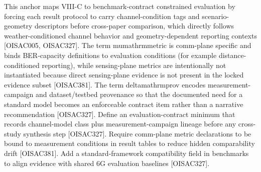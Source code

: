{}\markdownRendererDollarSign{}\markdownRendererDollarSign{}\markdownRendererParagraphSeparator
{}This anchor maps VIII-C to benchmark-contract constrained evaluation by forcing each result protocol to carry channel-condition tags and scenario-geometry descriptors before cross-paper comparison, which directly follows weather-conditioned channel behavior and geometry-dependent reporting contexts [O\markdownRendererUnderscore{}ISAC\markdownRendererUnderscore{}005, O\markdownRendererUnderscore{}ISAC\markdownRendererUnderscore{}327]. The term \markdownRendererDollarSign{}\markdownRendererBackslash{}mu\markdownRendererUnderscore{}\markdownRendererLeftBrace{}\markdownRendererBackslash{}mathrm\markdownRendererLeftBrace{}metric\markdownRendererRightBrace{}\markdownRendererRightBrace{}\markdownRendererDollarSign{} is comm-plane specific and binds BER-capacity definitions to evaluation conditions (for example distance-conditioned reporting), while sensing-plane metrics are intentionally not instantiated because direct sensing-plane evidence is not present in the locked evidence subset [O\markdownRendererUnderscore{}ISAC\markdownRendererUnderscore{}381]. The term \markdownRendererDollarSign{}\markdownRendererBackslash{}delta\markdownRendererUnderscore{}\markdownRendererLeftBrace{}\markdownRendererBackslash{}mathrm\markdownRendererLeftBrace{}prov\markdownRendererRightBrace{}\markdownRendererRightBrace{}\markdownRendererDollarSign{} encodes measurement-campaign and dataset/testbed provenance so that the documented need for a standard model becomes an enforceable contract item rather than a narrative recommendation [O\markdownRendererUnderscore{}ISAC\markdownRendererUnderscore{}327].\markdownRendererInterblockSeparator
{}
\markdownRendererSectionEnd \markdownRendererSectionBegin
{}\markdownRendererInterblockSeparator
{}\markdownRendererUlBeginTight
\markdownRendererUlItem Define an evaluation-contract minimum that records channel-model class plus measurement-campaign lineage before any cross-study synthesis step [O\markdownRendererUnderscore{}ISAC\markdownRendererUnderscore{}327].\markdownRendererUlItemEnd 
\markdownRendererUlItem Require comm-plane metric declarations to be bound to measurement conditions in result tables to reduce hidden comparability drift [O\markdownRendererUnderscore{}ISAC\markdownRendererUnderscore{}381].\markdownRendererUlItemEnd 
\markdownRendererUlItem Add a standard-framework compatibility field in benchmarks to align evidence with shared 6G evaluation baselines [O\markdownRendererUnderscore{}ISAC\markdownRendererUnderscore{}327].\markdownRendererUlItemEnd 
